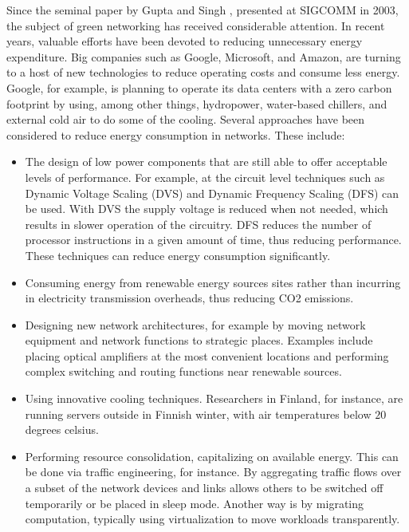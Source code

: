 Since the seminal paper by Gupta and Singh \cite{Gupta:2003:GI:863955.863959}, presented at SIGCOMM in 2003, the subject of green networking has received considerable attention. 
In recent years, valuable efforts have been devoted to reducing unnecessary energy expenditure.
Big companies such as Google, Microsoft, and Amazon, are turning to a host of new technologies to reduce operating costs and consume less energy.
Google, for example, is planning to operate its data centers with a zero carbon footprint by using, among other things, hydropower, water-based chillers, and external cold air to do some of the cooling.
Several approaches have been considered to reduce energy consumption in networks. These include:
\begin{itemize}
	\item The design of low power components that are still able to offer acceptable levels of performance. 
	For example, at the circuit level techniques such as Dynamic Voltage Scaling (DVS) and Dynamic Frequency Scaling (DFS) can be used. 
	With DVS the supply voltage is reduced when not needed, which results in slower operation of the circuitry. 
	DFS reduces the number of processor instructions in a given amount of time, thus reducing performance. 
	These techniques can reduce energy consumption significantly. 
	
	\item Consuming energy from renewable energy sources sites rather than incurring in electricity transmission overheads, thus reducing CO2 emissions.
	
	\item Designing new network architectures, for example by moving network equipment and network functions to strategic places. 
	Examples include placing optical amplifiers at the most convenient locations and performing complex switching and routing functions near renewable sources.
	
	\item Using innovative cooling techniques. Researchers in Finland, for instance, are running servers outside in Finnish winter, with air temperatures below $20$ degrees celsius.
	
	\item Performing resource consolidation, capitalizing on available energy. 
	This can be done via traffic engineering, for instance. 
	By aggregating traffic flows over a subset of the network devices and links allows others to be switched off temporarily or be placed in sleep mode. 
	Another way is by migrating computation, typically using virtualization to move workloads transparently.
	
\end{itemize}

